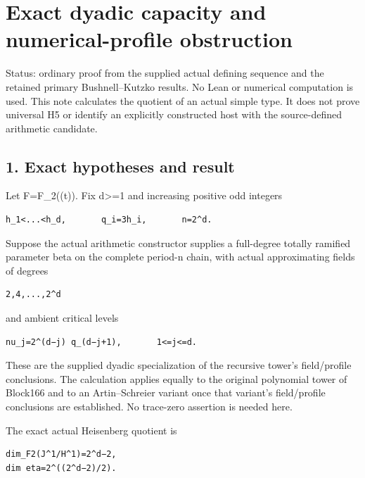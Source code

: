 \clearpage
\section{Exact dyadic capacity and numerical-profile obstruction}\label{app:dyadic_capacity}

Status: ordinary proof from the supplied actual defining sequence and
the retained primary Bushnell--Kutzko results. No Lean or numerical
computation is used. This note calculates the quotient of an actual
simple type. It does not prove universal H5 or identify an explicitly
constructed host with the source-defined arithmetic candidate.

\hypertarget{dyadic_capacity-exact-hypotheses-and-result}{%
\subsection{1. Exact hypotheses and
result}\label{dyadic_capacity-exact-hypotheses-and-result}}

Let F=F\_2((t)). Fix d\textgreater=1 and increasing positive odd
integers

\begin{Verbatim}[fontsize=\small,breaklines=true,breakanywhere=true]
h_1<...<h_d,       q_i=3h_i,       n=2^d.
\end{Verbatim}

Suppose the actual arithmetic constructor supplies a full-degree totally
ramified parameter beta on the complete period-n chain, with actual
approximating fields of degrees

\begin{Verbatim}[fontsize=\small,breaklines=true,breakanywhere=true]
2,4,...,2^d
\end{Verbatim}

and ambient critical levels

\begin{Verbatim}[fontsize=\small,breaklines=true,breakanywhere=true]
nu_j=2^(d−j) q_(d−j+1),       1<=j<=d.
\end{Verbatim}

These are the supplied dyadic specialization of the recursive tower's
field/profile conclusions. The calculation applies equally to the
original polynomial tower of Block166 and to an Artin--Schreier variant
once that variant's field/profile conclusions are established. No
trace-zero assertion is needed here.

The exact actual Heisenberg quotient is

\begin{Verbatim}[fontsize=\small,breaklines=true,breakanywhere=true]
dim_F2(J^1/H^1)=2^d−2,
dim eta=2^((2^d−2)/2).
\end{Verbatim}


